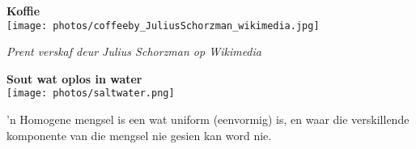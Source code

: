 
\begin{minipage}{.5\textwidth}
\begin{center}
\textbf{Koffie}\\
 \texttt{[image: photos/coffeeby\_JuliusSchorzman\_wikimedia.jpg]}\par
\textit{Prent verskaf deur Julius Schorzman op Wikimedia}
\end{center}
\end{minipage}
\begin{minipage}{.5\textwidth}
\begin{center}
\textbf{Sout wat oplos in water}\\
 \texttt{[image: photos/saltwater.png]}\par
\end{center}
\end{minipage}
\label{m38708*fhsst!!!underscore!!!id96} { \label{m38708*meaningfhsst!!!underscore!!!id96}
        'n Homogene mengsel is een wat uniform (eenvormig) is, en waar die verskillende komponente van die mengsel nie gesien kan word nie.
         } 

